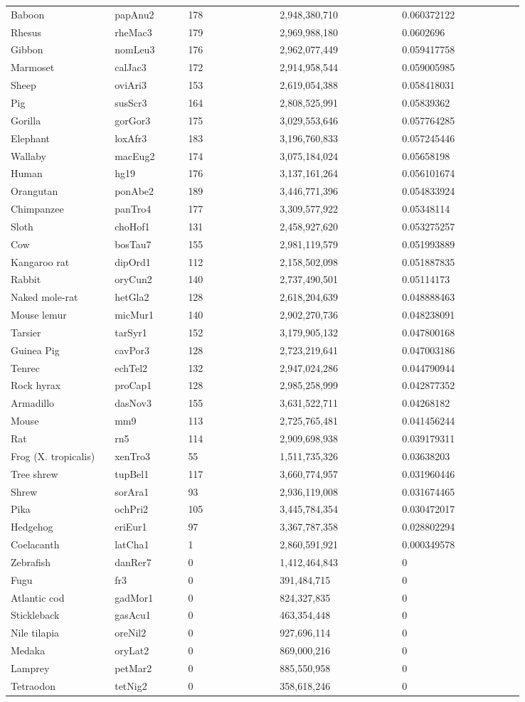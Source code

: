\begin{center}
\begin{longtable}{@{}p{0.17\linewidth}p{0.12\linewidth}p{0.15\linewidth}p{0.2\linewidth}p{0.2\linewidth}@{}}
Baboon & papAnu2 & 178 & 2,948,380,710 & 0.060372122\tabularnewline
Rhesus & rheMac3 & 179 & 2,969,988,180 & 0.0602696\tabularnewline
Gibbon & nomLeu3 & 176 & 2,962,077,449 & 0.059417758\tabularnewline
Marmoset & calJac3 & 172 & 2,914,958,544 & 0.059005985\tabularnewline
Sheep & oviAri3 & 153 & 2,619,054,388 & 0.058418031\tabularnewline
Pig & susScr3 & 164 & 2,808,525,991 & 0.05839362\tabularnewline
Gorilla & gorGor3 & 175 & 3,029,553,646 & 0.057764285\tabularnewline
Elephant & loxAfr3 & 183 & 3,196,760,833 & 0.057245446\tabularnewline
Wallaby & macEug2 & 174 & 3,075,184,024 & 0.05658198\tabularnewline
Human & hg19 & 176 & 3,137,161,264 & 0.056101674\tabularnewline
Orangutan & ponAbe2 & 189 & 3,446,771,396 & 0.054833924\tabularnewline
Chimpanzee & panTro4 & 177 & 3,309,577,922 & 0.05348114\tabularnewline
Sloth & choHof1 & 131 & 2,458,927,620 & 0.053275257\tabularnewline
Cow & bosTau7 & 155 & 2,981,119,579 & 0.051993889\tabularnewline
Kangaroo rat & dipOrd1 & 112 & 2,158,502,098 &
0.051887835\tabularnewline
Rabbit & oryCun2 & 140 & 2,737,490,501 & 0.05114173\tabularnewline
Naked mole-rat & hetGla2 & 128 & 2,618,204,639 &
0.048888463\tabularnewline
Mouse lemur & micMur1 & 140 & 2,902,270,736 & 0.048238091\tabularnewline
Tarsier & tarSyr1 & 152 & 3,179,905,132 & 0.047800168\tabularnewline
Guinea Pig & cavPor3 & 128 & 2,723,219,641 & 0.047003186\tabularnewline
Tenrec & echTel2 & 132 & 2,947,024,286 & 0.044790944\tabularnewline
Rock hyrax & proCap1 & 128 & 2,985,258,999 & 0.042877352\tabularnewline
Armadillo & dasNov3 & 155 & 3,631,522,711 & 0.04268182\tabularnewline
Mouse & mm9 & 113 & 2,725,765,481 & 0.041456244\tabularnewline
Rat & rn5 & 114 & 2,909,698,938 & 0.039179311\tabularnewline
Frog (X. tropicalis) & xenTro3 & 55 & 1,511,735,326 &
0.03638203\tabularnewline
Tree shrew & tupBel1 & 117 & 3,660,774,957 & 0.031960446\tabularnewline
Shrew & sorAra1 & 93 & 2,936,119,008 & 0.031674465\tabularnewline
Pika & ochPri2 & 105 & 3,445,784,354 & 0.030472017\tabularnewline
Hedgehog & eriEur1 & 97 & 3,367,787,358 & 0.028802294\tabularnewline
Coelacanth & latCha1 & 1 & 2,860,591,921 & 0.000349578\tabularnewline
Zebrafish & danRer7 & 0 & 1,412,464,843 & 0\tabularnewline
Fugu & fr3 & 0 & 391,484,715 & 0\tabularnewline
Atlantic cod & gadMor1 & 0 & 824,327,835 & 0\tabularnewline
Stickleback & gasAcu1 & 0 & 463,354,448 & 0\tabularnewline
Nile tilapia & oreNil2 & 0 & 927,696,114 & 0\tabularnewline
Medaka & oryLat2 & 0 & 869,000,216 & 0\tabularnewline
Lamprey & petMar2 & 0 & 885,550,958 & 0\tabularnewline
Tetraodon & tetNig2 & 0 & 358,618,246 & 0\tabularnewline
\end{longtable}
\end{center}

